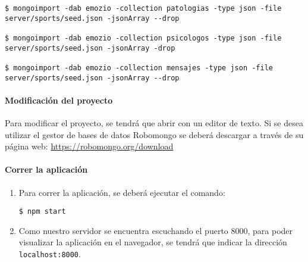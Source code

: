 \begin{enumerate}
\begin{enumerate}
\begin{lstlisting}[style=consola, numbers=none]
$ mongoimport -dab emozio -collection patologias -type json -file server/sports/seed.json -jsonArray --drop
	
$ mongoimport -dab emozio -collection psicologos -type json -file server/sports/seed.json -jsonArray -drop
	
$ mongoimport -dab emozio -collection mensajes -type json -file server/sports/seed.json -jsonArray --drop
	\end{lstlisting}
\end{enumerate}
\end{enumerate}


\paragraph*{Modificación del proyecto}


Para modificar el proyecto, se tendrá que abrir con un editor de texto.
Si se desea utilizar el gestor de bases de datos Robomongo se deberá descargar a través de su página web: \url{https://robomongo.org/download} 

\paragraph*{Correr la aplicación}
\begin{enumerate}
\item Para correr la aplicación, se deberá ejecutar el comando:
	\begin{lstlisting}[style=consola, numbers=none]
	$ npm start
	\end{lstlisting}
\item Como nuestro servidor se encuentra escuchando el puerto 8000, para poder visualizar la aplicación en el navegador, se tendrá que indicar la dirección \texttt{localhost:8000}.
\end{enumerate}